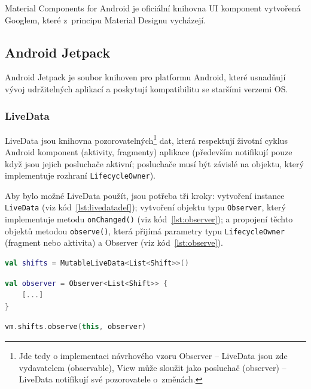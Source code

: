 \documentclass[twoside]{ctuthesis}
\begin{document}
Material Components for Android \cite{material2020material} je oficiální knihovna UI komponent vytvořená Googlem, které z~principu Material Designu vycházejí.

\subsection{Android Jetpack}
Android Jetpack \cite{android2020jetpack} je soubor knihoven pro platformu Android, které usnadňují vývoj udržitelných aplikací a poskytují kompatibilitu se staršími verzemi OS.

\subsubsection{LiveData}
LiveData jsou knihovna pozorovatelných\footnote{Jde tedy o implementaci návrhového vzoru Observer -- LiveData jsou zde vydavatelem (observable), View může sloužit jako posluchač (observer) -- LiveData notifikují své pozorovatele o~změnách.} dat, která respektují životní cyklus Android komponent (aktivity, fragmenty) aplikace (především notifikují pouze když jsou jejich posluchače aktivní; posluchače musí být závislé na objektu, který implementuje rozhraní \texttt{LifecycleOwner}).

Aby bylo možné LiveData použít, jsou potřeba tři kroky: vytvoření instance \texttt{LiveData} (viz kód~\ref{lst:livedatadef}); vytvoření objektu typu \texttt{Observer}, který implementuje metodu \texttt{onChanged()} (viz kód~\ref{lst:observer}); a propojení těchto objektů metodou \texttt{observe()}, která přijímá parametry typu \texttt{LifecycleOwner} (fragment nebo aktivita) a Observer (viz kód~\ref{lst:observe}). \cite{android2020livedata}


\begin{lstlisting}[language=Kotlin, caption={Definice LiveData ve ViewModelu}, label={lst:livedatadef}]
val shifts = MutableLiveData<List<Shift>>()
\end{lstlisting}

\begin{lstlisting}[language=Kotlin, caption={Definice observera v~UI komponentě}, label={lst:observer}]
val observer = Observer<List<Shift>> {
	[...]
}
\end{lstlisting}

\begin{lstlisting}[language=Kotlin, caption={Spojení Observera a LiveDat v~UI komponentě}, label={lst:observe}]
vm.shifts.observe(this, observer)
\end{lstlisting}
\end{document}
